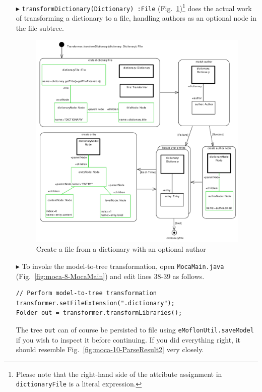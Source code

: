 \begin{enumerate}
\item[$\blacktriangleright$] \texttt{transformDictionary(Dictionary)~:File} (Fig.~\ref{fig:moca-transformDictionary})\footnote{Please note that the right-hand side of the attribute assignment in \texttt{dictionaryFile} is a literal expression.} does the actual work of transforming a dictionary to a file, handling authors as an optional node in the file subtree.
\begin{figure}[!htbp]
\begin{center}
 \includegraphics[width=\textwidth]{pics/moca/4ModelToMocaTree/transformDictionary}
  \caption{Create a file from a dictionary with an optional author} 
  \label{fig:moca-transformDictionary}
\end{center}
\end{figure}
\item[$\blacktriangleright$] To invoke the model-to-tree transformation, open \texttt{MocaMain.java} (Fig.~\ref{fig:moca-8-MocaMain}) and edit lines 38-39 as follows.
\begin{verbatim}
// Perform model-to-tree transformation
transformer.setFileExtension(".dictionary");
Folder out = transformer.transformLibraries();
\end{verbatim}
The tree \texttt{out} can of course be persisted to file using \texttt{eMoflonUtil\-.save\-Model} if you wish to inspect it before continuing.
If you did everything right, it should resemble Fig.~\ref{fig:moca-10-ParseResult2} very closely. 
\end{enumerate}